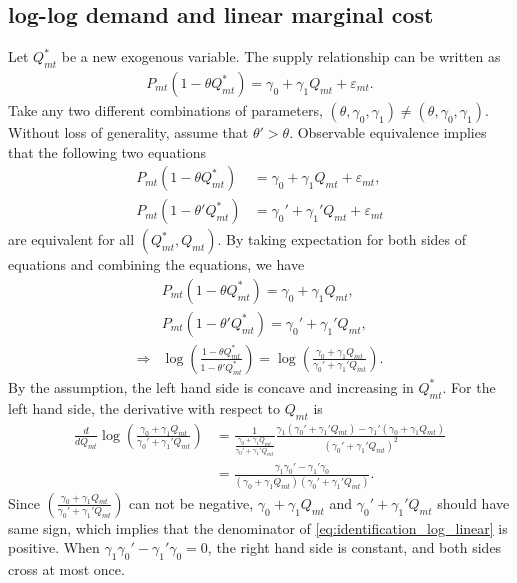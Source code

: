 \documentclass[11pt]{article}
\numberwithin{figure}{section}
\theoremstyle{definition}
\newcommand{\0}{\mathbf{0}}
\begin{document}
\subsection{ log-log demand and linear marginal cost}
Let $Q^*_{mt}$ be a new exogenous variable. The supply relationship can be written as 
\begin{align*}
    P_{mt}(1- \theta Q^*_{mt}) = \gamma_0 + \gamma_1 Q_{mt} + \varepsilon_{mt}.
\end{align*}
Take any two different combinations of parameters, $(\theta, \gamma_0, \gamma_1) \ne (\theta, \gamma_0, \gamma_1)$. Without loss of generality, assume that $\theta' > \theta$. Observable equivalence implies that the following two equations
\begin{align*}
    P_{mt}(1- \theta Q^*_{mt}) &= \gamma_0 + \gamma_1 Q_{mt} + \varepsilon_{mt},\\
    P_{mt}(1- \theta' Q^*_{mt}) &= \gamma_0' + \gamma_1' Q_{mt} + \varepsilon_{mt}
\end{align*}
are equivalent for all $(Q^*_{mt}, Q_{mt})$.
By taking expectation for both sides of equations and combining the equations, we have
\begin{align}
    & P_{mt}(1- \theta Q^*_{mt}) = \gamma_0 + \gamma_1 Q_{mt}\nonumber,\\
    & P_{mt}(1- \theta'Q^*_{mt}) = \gamma_0' + \gamma_1' Q_{mt}\nonumber,\\
    \Longrightarrow &\log\left(\frac{1- \theta Q^*_{mt}}{1- \theta' Q^*_{mt}} \right)  = \log\left(\frac{\gamma_0 + \gamma_1 Q_{mt}}{\gamma_0' + \gamma_1' Q_{mt}} \right).
\end{align}
By the assumption, the left hand side is concave and increasing in $Q^*_{mt}$. For the left hand side, the derivative with respect to $Q_{mt}$ is 
\begin{align}
    \frac{d}{d Q_{mt}} \log\left(\frac{\gamma_0 + \gamma_1 Q_{mt}}{\gamma_0' + \gamma_1' Q_{mt}} \right) & = \frac{1}{\frac{\gamma_0 + \gamma_1 Q_{mt}}{\gamma_0' + \gamma_1' Q_{mt}}} \frac{\gamma_1 (\gamma_0' + \gamma_1' Q_{mt}) - \gamma_1' (\gamma_0 + \gamma_1 Q_{mt})}{(\gamma_0' + \gamma_1' Q_{mt})^2}\nonumber\\
    & = \frac{\gamma_1\gamma_0' - \gamma_1' \gamma_0}{(\gamma_0 + \gamma_1 Q_{mt})(\gamma_0' + \gamma_1' Q_{mt})}. \label{eq:identification_log_linear}
\end{align}
Since $\left(\frac{\gamma_0 + \gamma_1 Q_{mt}}{\gamma_0' + \gamma_1' Q_{mt}} \right)$ can not be negative, $\gamma_0 + \gamma_1 Q_{mt}$ and $\gamma_0' + \gamma_1' Q_{mt}$ should have same sign, which implies that the denominator of \eqref{eq:identification_log_linear} is positive. When $\gamma_1\gamma_0' - \gamma_1' \gamma_0=0$, the right hand side is constant, and both sides cross at most once.
\end{document}
